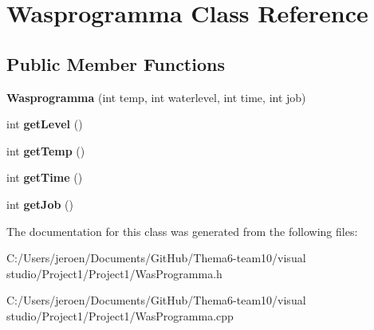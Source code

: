 \hypertarget{class_wasprogramma}{}\section{Wasprogramma Class Reference}
\label{class_wasprogramma}
\subsection*{Public Member Functions}
\begin{DoxyCompactItemize}
\item 
{\bfseries Wasprogramma} (int temp, int waterlevel, int time, int job)\hypertarget{class_wasprogramma_a26f14d17e0c3a722dca2a3489e450220}{}\label{class_wasprogramma_a26f14d17e0c3a722dca2a3489e450220}

\item 
int {\bfseries get\+Level} ()\hypertarget{class_wasprogramma_acb75962e91340a05afb9208df0986fdf}{}\label{class_wasprogramma_acb75962e91340a05afb9208df0986fdf}

\item 
int {\bfseries get\+Temp} ()\hypertarget{class_wasprogramma_a4fec376e0f3b90ad1cff57b57bc5f3b3}{}\label{class_wasprogramma_a4fec376e0f3b90ad1cff57b57bc5f3b3}

\item 
int {\bfseries get\+Time} ()\hypertarget{class_wasprogramma_a3e7c63b2af9a06e1735e65b631979b8e}{}\label{class_wasprogramma_a3e7c63b2af9a06e1735e65b631979b8e}

\item 
int {\bfseries get\+Job} ()\hypertarget{class_wasprogramma_aeb21e9e3aee86497c420b3f30633f8c0}{}\label{class_wasprogramma_aeb21e9e3aee86497c420b3f30633f8c0}

\end{DoxyCompactItemize}


The documentation for this class was generated from the following files\+:\begin{DoxyCompactItemize}
\item 
C\+:/\+Users/jeroen/\+Documents/\+Git\+Hub/\+Thema6-\/team10/visual studio/\+Project1/\+Project1/Was\+Programma.\+h\item 
C\+:/\+Users/jeroen/\+Documents/\+Git\+Hub/\+Thema6-\/team10/visual studio/\+Project1/\+Project1/Was\+Programma.\+cpp\end{DoxyCompactItemize}
